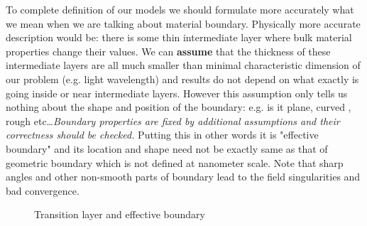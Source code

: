 \documentclass[12pt]{article}
\begin{document}
To complete definition of our models we should formulate more accurately what we mean when we are talking about material boundary. Physically more accurate description would be: there is some thin intermediate layer where bulk material properties change their values. We can {\bf assume} that the thickness of these intermediate layers are all much smaller than minimal characteristic dimension of our problem (e.g. light wavelength) and results do not depend on what exactly is going inside or near intermediate layers. However this assumption only tells us nothing about the shape and position of the boundary: e.g. is it plane, curved , rough  etc\ldots  {\em Boundary properties are fixed by additional assumptions and their correctness should be checked.}  Putting this in other words it is "effective boundary" and its location and shape need not be exactly same as that of geometric boundary which is not defined at nanometer scale. Note that sharp angles and other non-smooth parts of boundary lead to the field singularities and bad convergence.
  
\begin{figure}[h]
    \centering
    \caption{Transition layer and effective boundary}
    \label{fig:effb}
\end{figure}
\end{document}
